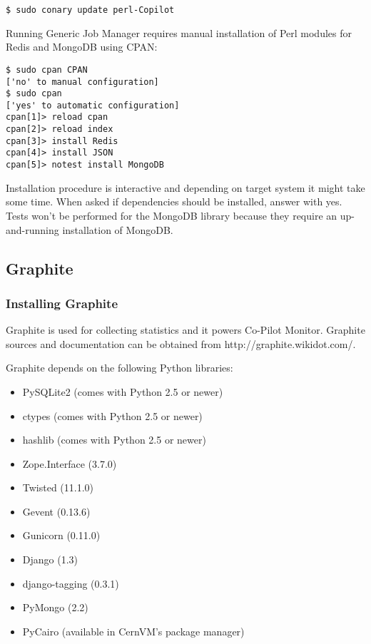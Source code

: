 \lstset{caption=Installing \copilot dependencies on CernVM}
\begin{lstlisting}
$ sudo conary update perl-Copilot
\end{lstlisting}

Running \copilot Generic Job Manager requires manual installation of Perl modules for Redis and MongoDB using CPAN:

\lstset{caption=Installing Perl modules}
\begin{lstlisting}
$ sudo cpan CPAN
['no' to manual configuration]
$ sudo cpan
['yes' to automatic configuration]
cpan[1]> reload cpan
cpan[2]> reload index
cpan[3]> install Redis
cpan[4]> install JSON
cpan[5]> notest install MongoDB
\end{lstlisting}

Installation procedure is interactive and depending on target system it might take some time. When asked if dependencies should be installed, answer with yes. Tests won't be performed for the MongoDB library because they require an up-and-running installation of MongoDB.

\subsection{Graphite}
\subsubsection{Installing Graphite}
Graphite is used for collecting statistics and it powers Co-Pilot Monitor.
Graphite sources and documentation can be obtained from http://graphite.wikidot.com/.

Graphite depends on the following Python libraries:
\begin{itemize}
  \item PySQLite2 (comes with Python 2.5 or newer)
  \item ctypes (comes with Python 2.5 or newer)
  \item hashlib (comes with Python 2.5 or newer)
  \item Zope.Interface (3.7.0)
  \item Twisted (11.1.0)
  \item Gevent (0.13.6)
  \item Gunicorn (0.11.0)
  \item Django (1.3)
  \item django-tagging (0.3.1)
  \item PyMongo (2.2)
  \item PyCairo (available in CernVM's package manager)
\end{itemize}

